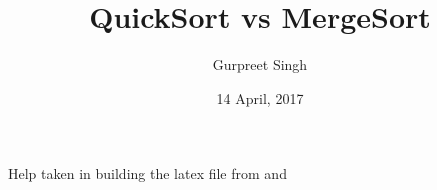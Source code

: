 \documentclass[a4paper,10pt]{article}
\title{QuickSort vs MergeSort}
\author{Gurpreet Singh}
\date{14 April, 2017}
\begin{document}
\begin{titlingpage}
\maketitle
\end{titlingpage}






Help taken in building the latex file from \cite{1} and \cite{2}



\end{document}
